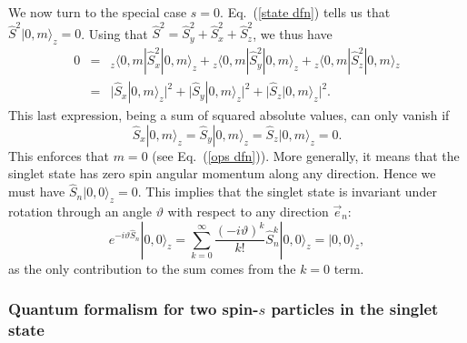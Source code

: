 We now turn to the special case $s=0$. Eq.\ (\ref{state dfn}) tells us that $\hat{S}^2 |0,m\rangle_z=0$. Using that $\hat{S}^2 = \hat{S}_y^2 + \hat{S}_x^2 +\hat{S}_z^2$, we thus have
\begin{eqnarray}
0 &\!\!=\!\!& {_z} \langle 0,m|\hat{S}_x^2 |0,m\rangle_z + {_z}\langle 0,m|\hat{S}_y^2 |0,m\rangle_z + {_z}\langle 0,m|\hat{S}_z^2 |0,m\rangle{_z} \nonumber \\[.3 cm]
&\!\!=\!\!& \Big|\hat{S}_x|0,m\rangle_z \Big|^2 + \Big|\hat{S}_y|0,m\rangle_z \Big|^2 +\Big|\hat{S}_z|0,m\rangle_z \Big|^2.
\label{zero spin}
\end{eqnarray}
This last expression, being a sum of squared absolute values, can only vanish if 
\begin{equation}
\hat{S}_x |0,m\rangle_z = \hat{S}_y |0,m\rangle_z = \hat{S}_z |0,m\rangle_z = 0. 
\label{zero comps}
\end{equation}
This enforces that $m=0$ (see Eq.\ (\ref{ops dfn})). More generally, it means that the singlet state has zero spin angular momentum along any direction. Hence we must have $\hat{S}_n|0,0\rangle_z = 0$. This implies that the singlet state is invariant under rotation through an angle $\vartheta$ with respect to any direction $\vec{e}_n$:
\begin{equation}
e^{-i\vartheta \hat{S}_n }|0,0\rangle_{z} = \sum_{k=0}^\infty \frac{(-i\vartheta)^k}{k!}\hat{S}^k_n|0,0\rangle_z = |0,0\rangle_z,
\label{singlet rot}
\end{equation}
as the only contribution to the sum comes from the $k=0$ term.

\subsubsection{Quantum formalism for two spin-$s$ particles in the singlet state} \label{2.1.2}


